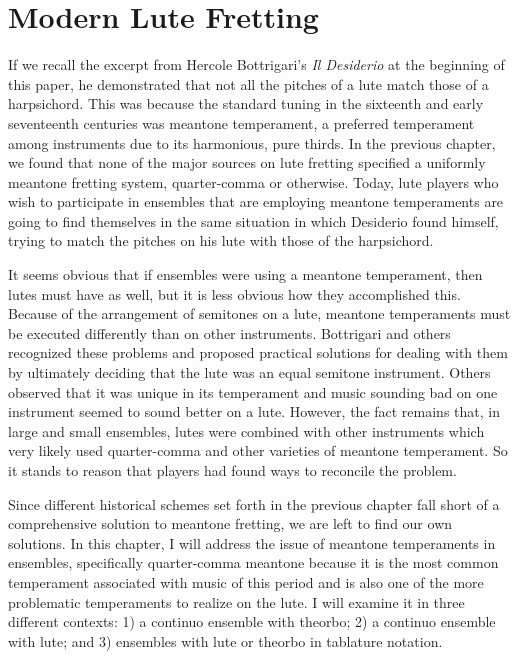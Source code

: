 \chapter{Modern Lute Fretting}

If we recall the excerpt from Hercole Bottrigari's \textit{Il Desiderio} at the beginning of this
paper, he demonstrated that not all the pitches of a lute match  those of a harpsichord.  This was
because the standard tuning in the sixteenth and early seventeenth centuries was meantone
temperament, a preferred temperament among instruments due to its harmonious, pure thirds. In the
previous  chapter, we found that none of the major sources on lute fretting specified a uniformly
meantone fretting system, quarter-comma or otherwise. Today, lute players who wish to participate in
ensembles that are employing meantone temperaments are going to find themselves in the same
situation in which Desiderio found himself, trying to match the pitches on his lute with those of
the harpsichord.

It seems obvious that if ensembles were using a meantone temperament, then lutes must have as well,
but it is less obvious how they accomplished this. Because of the arrangement of semitones on a
lute, meantone temperaments must be executed differently than on other instruments.  Bottrigari and
others recognized these problems and proposed practical solutions for dealing with them by
ultimately deciding that the lute was an equal semitone instrument.  Others observed that it was
unique in its temperament and music sounding bad on one instrument seemed to sound better on a
lute.\autocite[45]{ML:1}  However, the fact remains that, in large and small ensembles, lutes were
combined with other instruments which very likely used quarter-comma and other varieties of meantone
temperament.  So it stands to reason that players had found ways to reconcile the problem.

Since different historical schemes set forth in the previous chapter fall short of a comprehensive
solution to meantone fretting, we are left to find our own solutions. In this chapter, I will
address the issue of meantone temperaments in ensembles, specifically quarter-comma meantone because
it is the most common temperament associated with music of this period and is also one of the more
problematic temperaments to realize on the lute. I will examine it in three different contexts: 1) a
continuo ensemble with theorbo; 2) a continuo ensemble with lute; and 3) ensembles with lute or
theorbo in tablature notation.

